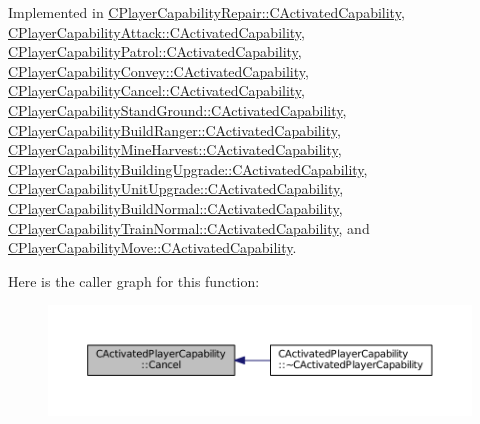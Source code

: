 Implemented in \hyperlink{classCPlayerCapabilityRepair_1_1CActivatedCapability_a719cee3446291470987f504739f63215}{C\+Player\+Capability\+Repair\+::\+C\+Activated\+Capability}, \hyperlink{classCPlayerCapabilityAttack_1_1CActivatedCapability_a0796fbda8a35b60a2320becfdf2b5c13}{C\+Player\+Capability\+Attack\+::\+C\+Activated\+Capability}, \hyperlink{classCPlayerCapabilityPatrol_1_1CActivatedCapability_a36165c232eb283ce4a92bd4606480c73}{C\+Player\+Capability\+Patrol\+::\+C\+Activated\+Capability}, \hyperlink{classCPlayerCapabilityConvey_1_1CActivatedCapability_ad84a94a1ae3647ea160e262a0154e229}{C\+Player\+Capability\+Convey\+::\+C\+Activated\+Capability}, \hyperlink{classCPlayerCapabilityCancel_1_1CActivatedCapability_accd67b449574b6c99e21f522d13bc96a}{C\+Player\+Capability\+Cancel\+::\+C\+Activated\+Capability}, \hyperlink{classCPlayerCapabilityStandGround_1_1CActivatedCapability_ac75cd8a26726adb60cf045f99059ca7d}{C\+Player\+Capability\+Stand\+Ground\+::\+C\+Activated\+Capability}, \hyperlink{classCPlayerCapabilityBuildRanger_1_1CActivatedCapability_a46a5240502d6a8de65d3d56bbda8bf91}{C\+Player\+Capability\+Build\+Ranger\+::\+C\+Activated\+Capability}, \hyperlink{classCPlayerCapabilityMineHarvest_1_1CActivatedCapability_ab1fef064fbc085a6419b5a822e787614}{C\+Player\+Capability\+Mine\+Harvest\+::\+C\+Activated\+Capability}, \hyperlink{classCPlayerCapabilityBuildingUpgrade_1_1CActivatedCapability_adca97e7f7611f4adfcfea615428dac0b}{C\+Player\+Capability\+Building\+Upgrade\+::\+C\+Activated\+Capability}, \hyperlink{classCPlayerCapabilityUnitUpgrade_1_1CActivatedCapability_a29b41666081cf420e9f3b7d93c09920b}{C\+Player\+Capability\+Unit\+Upgrade\+::\+C\+Activated\+Capability}, \hyperlink{classCPlayerCapabilityBuildNormal_1_1CActivatedCapability_a7cc74f98f4071edfa75395d02d897fef}{C\+Player\+Capability\+Build\+Normal\+::\+C\+Activated\+Capability}, \hyperlink{classCPlayerCapabilityTrainNormal_1_1CActivatedCapability_a028dc1f8c528cc726737d712f0236884}{C\+Player\+Capability\+Train\+Normal\+::\+C\+Activated\+Capability}, and \hyperlink{classCPlayerCapabilityMove_1_1CActivatedCapability_a6fe1e26646bd14e94ebf7abd0a41cdd3}{C\+Player\+Capability\+Move\+::\+C\+Activated\+Capability}.

Here is the caller graph for this function\+:
\nopagebreak
\begin{figure}[H]
\begin{center}
\leavevmode
\includegraphics[width=350pt]{classCActivatedPlayerCapability_a5cde83be468e262ad054d81e28684a81_icgraph}
\end{center}
\end{figure}
\hypertarget{classCActivatedPlayerCapability_a943b5999a57504399293250382c0ec6a}{}\label{classCActivatedPlayerCapability_a943b5999a57504399293250382c0ec6a} 

